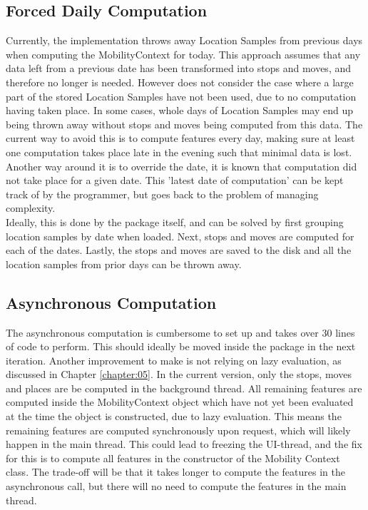 \subsection{Forced Daily Computation}
Currently, the implementation throws away Location Samples from previous days when computing the MobilityContext for today. This approach assumes that any data left from a previous date has been transformed into stops and moves, and therefore no longer is needed. However does not consider the case where a large part of the stored Location Samples have not been used, due to no computation having taken place. In some cases, whole days of Location Samples may end up being thrown away without stops and moves being computed from this data. The current way to avoid this is to compute features every day, making sure at least one computation takes place late in the evening such that minimal data is lost. Another way around it is to override the date, it is known that computation did not take place for a given date. This 'latest date of computation' can be kept track of by the programmer, but goes back to the problem of managing complexity. \\

Ideally, this is done by the package itself, and can be solved by first grouping location samples by date when loaded. Next, stops and moves are computed for each of the dates. Lastly, the stops and moves are saved to the disk and all the location samples from prior days can be thrown away.

\subsection{Asynchronous Computation}
The asynchronous computation is cumbersome to set up and takes over 30 lines of code to perform. This should ideally be moved inside the package in the next iteration. Another improvement to make is not relying on lazy evaluation, as discussed in Chapter \ref{chapter:05}. In the current version, only the stops, moves and places are be computed in the background thread. All remaining features are computed inside the MobilityContext object which have not yet been evaluated at the time the object is constructed, due to lazy evaluation. This means the remaining features are computed synchronously upon request, which will likely happen in the main thread. This could lead to freezing the UI-thread, and the fix for this is to compute all features in the constructor of the Mobility Context class. The trade-off will be that it takes longer to compute the features in the asynchronous call, but there will no need to compute the features in the main thread.

